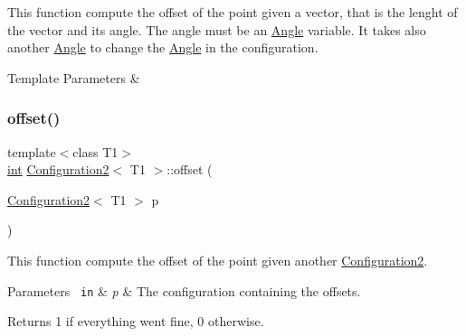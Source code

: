 This function compute the offset of the point given a vector, that is the lenght of the vector and its angle. The angle must be an {\ttfamily \mbox{\hyperlink{class_angle}{Angle}}} variable. It takes also another {\ttfamily \mbox{\hyperlink{class_angle}{Angle}}} to change the {\ttfamily \mbox{\hyperlink{class_angle}{Angle}}} in the configuration. 


\begin{DoxyTemplParams}{Template Parameters}
{\em } & \\
\hline
\end{DoxyTemplParams}
\mbox{\label{class_configuration2_abc07742a00822719024a8a58d003a6f1}} 
\subsubsection{\texorpdfstring{offset()}{offset()}\hspace{0.1cm}{\footnotesize\ttfamily [2/3]}}
{\footnotesize\ttfamily template$<$class T1$>$ \\
\mbox{\hyperlink{draw_8hh_aa620a13339ac3a1177c86edc549fda9b}{int}} \mbox{\hyperlink{class_configuration2}{Configuration2}}$<$ T1 $>$\+::offset (\begin{DoxyParamCaption}\item[{\mbox{\hyperlink{class_configuration2}{Configuration2}}$<$ T1 $>$}]{p }\end{DoxyParamCaption})\hspace{0.3cm}{\ttfamily [inline]}}



This function compute the offset of the point given another {\ttfamily \mbox{\hyperlink{class_configuration2}{Configuration2}}}. 


\begin{DoxyParams}[1]{Parameters}
\mbox{\texttt{ in}}  & {\em p} & The configuration containing the offsets. \\
\hline
\end{DoxyParams}
\begin{DoxyReturn}{Returns}
1 if everything went fine, 0 otherwise. 
\end{DoxyReturn}
\mbox{\label{class_configuration2_ad2f7df498d8fd4c0e125a1f628fa22b7}} 
